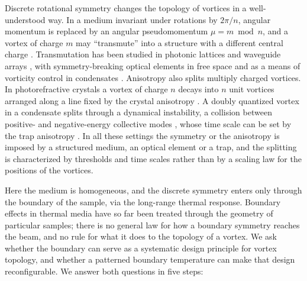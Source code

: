 Discrete rotational symmetry changes the topology of vortices in a well-understood way. In a medium invariant under rotations by \(2\pi/n\), angular momentum is replaced by an angular pseudomomentum \(\mu = m \bmod n\), and a vortex of charge \(m\) may ``transmute'' into a structure with a different central charge \citep{Ferrando2005vortex, GarciaMarch2009symmetry, GarciaMarch2009physd, Zacares2009}. Transmutation has been studied in photonic lattices and waveguide arrays \citep{Kartashov2023arrays, Dong2022twisted}, with symmetry-breaking optical elements in free space \citep{Novoa2014offaxis, Zhang2019metasurface} and as a means of vorticity control in condensates \citep{PerezGarcia2007}. Anisotropy also splits multiply charged vortices. In photorefractive crystals a vortex of charge \(n\) decays into \(n\) unit vortices arranged along a line fixed by the crystal anisotropy \citep{Mamaev1996pair, Mamaev1997decay}. A doubly quantized vortex in a condensate splits through a dynamical instability, a collision between positive- and negative-energy collective modes \citep{Skryabin2001, Mottonen2003split, Shin2004dqv, Kawaguchi2004split, Lundh2006, Nilsen2008splitting, Kapitula2013krein, Takeuchi2018}, whose time scale can be set by the trap anisotropy \citep{Xiong2020ring}. In all these settings the symmetry or the anisotropy is imposed by a structured medium, an optical element or a trap, and the splitting is characterized by thresholds and time scales rather than by a scaling law for the positions of the vortices.

Here the medium is homogeneous, and the discrete symmetry enters only through the boundary of the sample, via the long-range thermal response. Boundary effects in thermal media have so far been treated through the geometry of particular samples; there is no general law for how a boundary symmetry reaches the beam, and no rule for what it does to the topology of a vortex. We ask whether the boundary can serve as a systematic design principle for vortex topology, and whether a patterned boundary temperature can make that design reconfigurable. We answer both questions in five steps:

